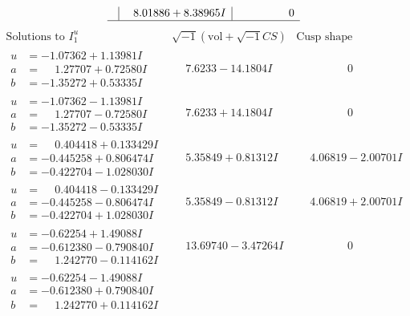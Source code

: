 \documentclass[1p]{elsarticle_modified}
\theoremstyle{definition}
\newcommand{\I}{\sqrt{-1}}
\begin{document}
$$\begin{array}{c|c|c}
 & \phantom{-}8.01886 + 8.38965 I & \phantom{-0.000000 } 0\\
 \hline 
 \end{array}$$\newpage$$\begin{array}{c|c|c}  
\text{Solutions to }I^u_{1}& \I (\text{vol} + \sqrt{-1}CS) & \text{Cusp shape}\\
 \hline 
\begin{aligned}
u &= -1.07362 + 1.13981 I \\
a &= \phantom{-}1.27707 + 0.72580 I \\
b &= -1.35272 + 0.53335 I\end{aligned}
 & \phantom{-}7.6233 - 14.1804 I & \phantom{-0.000000 } 0 \\ \hline\begin{aligned}
u &= -1.07362 - 1.13981 I \\
a &= \phantom{-}1.27707 - 0.72580 I \\
b &= -1.35272 - 0.53335 I\end{aligned}
 & \phantom{-}7.6233 + 14.1804 I & \phantom{-0.000000 } 0 \\ \hline\begin{aligned}
u &= \phantom{-}0.404418 + 0.133429 I \\
a &= -0.445258 + 0.806474 I \\
b &= -0.422704 - 1.028030 I\end{aligned}
 & \phantom{-}5.35849 + 0.81312 I & \phantom{-}4.06819 - 2.00701 I \\ \hline\begin{aligned}
u &= \phantom{-}0.404418 - 0.133429 I \\
a &= -0.445258 - 0.806474 I \\
b &= -0.422704 + 1.028030 I\end{aligned}
 & \phantom{-}5.35849 - 0.81312 I & \phantom{-}4.06819 + 2.00701 I \\ \hline\begin{aligned}
u &= -0.62254 + 1.49088 I \\
a &= -0.612380 - 0.790840 I \\
b &= \phantom{-}1.242770 - 0.114162 I\end{aligned}
 & \phantom{-}13.69740 - 3.47264 I & \phantom{-0.000000 } 0 \\ \hline\begin{aligned}
u &= -0.62254 - 1.49088 I \\
a &= -0.612380 + 0.790840 I \\
b &= \phantom{-}1.242770 + 0.114162 I\end{aligned}

\end{array}$$
\end{document}

